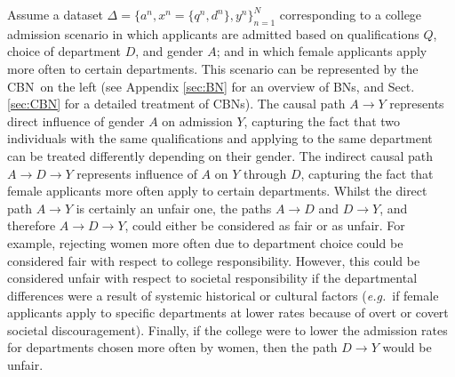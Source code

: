 \documentclass[runningheads]{llncs}
\newcommand{\secref}[1]{Sect. \ref{#1}}
\newcommand{\appref}[1]{Appendix \ref{#1}}
\newcommand{\eg}{\emph{e.g.}}
\newcommand{\CBN}{CBN}
\newcommand{\CBNs}{CBNs}
\begin{document}
\begin{figure}
\vskip-0.75cm
\end{figure}
\noindent Assume a dataset $\Delta =\{a^n,x^n=\{q^n,d^n\},y^n\}_{n=1}^N$ corresponding to a college admission scenario in which applicants are admitted based on qualifications $Q$, choice of department $D$, and gender $A$; and in which female applicants apply more often to certain departments. This scenario can be represented by the \CBN~on the left (see \appref{sec:BN} for an overview of BNs, and \secref{sec:CBN} for a detailed treatment of \CBNs). The causal path $A\rightarrow Y$ represents direct influence of gender $A$ on admission $Y$, capturing the fact that two individuals with the same qualifications and applying to the same department can be treated differently depending on their gender. The indirect causal path $A\rightarrow D \rightarrow Y$ represents influence of $A$ on $Y$ through $D$, capturing the fact that female applicants more often apply to certain departments. Whilst the direct path $A\rightarrow Y$ is certainly an unfair one, the paths $A\rightarrow D$ and $D\rightarrow Y$, and therefore $A\rightarrow D \rightarrow Y$, could either be considered as fair or as unfair. For example, rejecting women more often due to department choice could be considered fair with respect to college responsibility. However, this could be considered unfair with respect to societal responsibility if the departmental differences were a result of systemic historical or cultural factors (\eg~if female applicants apply to specific departments at lower rates because of overt or covert societal discouragement). Finally, if the college were to lower the admission rates for departments chosen more often by women, then the path $D \rightarrow Y$ would be unfair.
\end{document}
